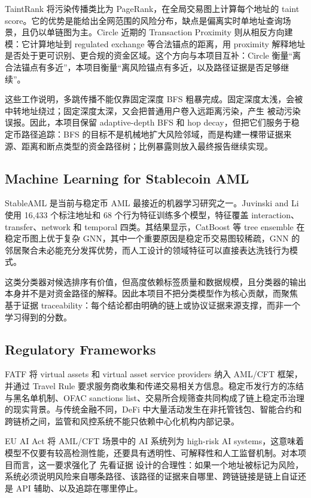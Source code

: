 \documentclass[12pt,a4paper]{ctexart}
\begin{document}
TaintRank 将污染传播类比为 PageRank，在全局交易图上计算每个地址的 taint
score。它的优势是能给出全网范围的风险分布，缺点是偏离实时单地址查询场景，且仍以单链图为主。Circle
近期的 Transaction Proximity 则从相反方向建模：它计算地址到 regulated
exchange 等合法锚点的距离，用 proximity
解释地址是否处于更可识别、更合规的资金区域。这个方向与本项目互补：Circle
衡量``离合法锚点有多近''，本项目衡量``离风险锚点有多近，以及路径证据是否足够继续''。

这些工作说明，多跳传播不能仅靠固定深度 BFS
粗暴完成。固定深度太浅，会被中转地址绕过；固定深度太深，又会把普通用户卷入远距离污染，产生
被动污染误报。因此，本项目保留 adaptive-depth BFS 和 hop
decay，但把它们服务于稳定币路径追踪：BFS
的目标不是机械地扩大风险邻域，而是构建一棵带证据来源、距离和断点类型的资金路径树；比例暴露则放入最终报告继续实现。

\hypertarget{machine-learning-for-stablecoin-aml}{%
\subsection{Machine Learning for Stablecoin
AML}\label{machine-learning-for-stablecoin-aml}}

StableAML 是当前与稳定币 AML 最接近的机器学习研究之一。Juvinski and Li
使用 16,433 个标注地址和 68 个行为特征训练多个模型，特征覆盖
interaction、transfer、network 和 temporal 四类。其结果显示，CatBoost 等
tree ensemble 在稳定币图上优于复杂
GNN，其中一个重要原因是稳定币交易图较稀疏，GNN
的邻居聚合未必能充分发挥优势，而人工设计的领域特征可以直接表达洗钱行为模式。

这类分类器对候选排序有价值，但高度依赖标签质量和数据规模，且分类器的输出本身并不是对资金路径的解释。因此本项目不把分类模型作为核心贡献，而聚焦
基于证据
traceability：每个结论都由明确的链上或协议证据来源支撑，而非一个学习得到的分数。

\hypertarget{regulatory-frameworks}{%
\subsection{Regulatory Frameworks}\label{regulatory-frameworks}}

FATF 将 virtual assets 和 virtual asset service providers 纳入 AML/CFT
框架，并通过 Travel Rule
要求服务商收集和传递交易相关方信息。稳定币发行方的冻结与黑名单机制、OFAC
sanctions
list、交易所合规筛查共同构成了链上稳定币治理的现实背景。与传统金融不同，DeFi
中大量活动发生在非托管钱包、智能合约和跨链桥之间，监管和风控系统不能只依赖中心化机构内部记录。

EU AI Act 将 AML/CFT 场景中的 AI 系统列为 high-risk AI
systems，这意味着模型不仅要有较高检测性能，还要具有透明性、可解释性和人工监督机制。对本项目而言，这一要求强化了
先看证据
设计的合理性：如果一个地址被标记为风险，系统必须说明风险来自哪条路径、该路径的证据来自哪里、跨链链接是链上自证还是
API 辅助、以及追踪在哪里停止。
\end{document}
